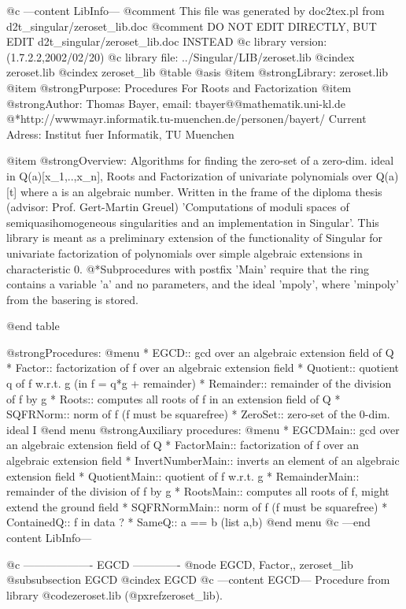 @c ---content LibInfo---
@comment This file was generated by doc2tex.pl from d2t_singular/zeroset_lib.doc
@comment DO NOT EDIT DIRECTLY, BUT EDIT d2t_singular/zeroset_lib.doc INSTEAD
@c library version: (1.7.2.2,2002/02/20)
@c library file: ../Singular/LIB/zeroset.lib
@cindex zeroset.lib
@cindex zeroset_lib
@table @asis
@item @strong{Library:}
zeroset.lib
@item @strong{Purpose:}
      Procedures For Roots and Factorization
@item @strong{Author:}
Thomas Bayer, email: tbayer@@mathematik.uni-kl.de
@*http://wwwmayr.informatik.tu-muenchen.de/personen/bayert/
Current Adress: Institut fuer Informatik, TU Muenchen

@item @strong{Overview:}
Algorithms for finding the zero-set of a zero-dim. ideal in Q(a)[x_1,..,x_n],
Roots and Factorization of univariate polynomials over Q(a)[t]
where a is an algebraic number. Written in the frame of the
diploma thesis (advisor: Prof. Gert-Martin Greuel) 'Computations of moduli
spaces of semiquasihomogeneous singularities and an implementation in Singular'.
This library is meant as a preliminary extension of the functionality
of Singular for univariate factorization of polynomials over simple algebraic
extensions in characteristic 0.
@*Subprocedures with postfix 'Main' require that the ring contains a variable
'a' and no parameters, and the ideal 'mpoly', where 'minpoly' from the
basering is stored.

@end table

@strong{Procedures:}
@menu
* EGCD:: gcd over an algebraic extension field of Q
* Factor:: factorization of f over an algebraic extension field
* Quotient:: quotient q of f w.r.t. g (in f = q*g + remainder)
* Remainder:: remainder of the division of f by g
* Roots:: computes all roots of f in an extension field of Q
* SQFRNorm:: norm of f (f must be squarefree)
* ZeroSet:: zero-set of the 0-dim. ideal I
@end menu
@strong{Auxiliary procedures:}
@menu
* EGCDMain:: gcd over an algebraic extension field of Q
* FactorMain:: factorization of f over an algebraic extension field
* InvertNumberMain:: inverts an element of an algebraic extension field
* QuotientMain:: quotient of f w.r.t. g
* RemainderMain:: remainder of the division of f by g
* RootsMain:: computes all roots of f, might extend the ground field
* SQFRNormMain:: norm of f (f must be squarefree)
* ContainedQ:: f in data ?
* SameQ:: a == b (list a,b)
@end menu
@c ---end content LibInfo---

@c ------------------- EGCD -------------
@node EGCD, Factor,, zeroset_lib
@subsubsection EGCD
@cindex EGCD
@c ---content EGCD---
Procedure from library @code{zeroset.lib} (@pxref{zeroset_lib}).

